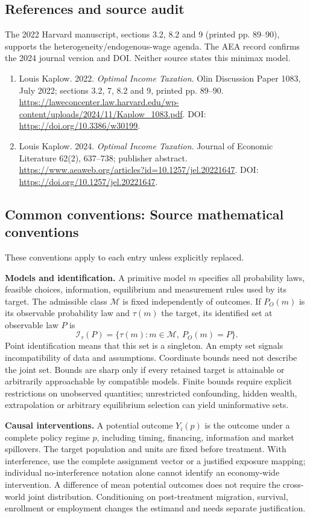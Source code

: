 \documentclass[11pt,a4paper]{article}
\begin{document}
\subsection*{References and source audit}
The 2022 Harvard manuscript, sections 3.2, 8.2 and 9 (printed pp. 89--90), supports the heterogeneity/endogenous-wage agenda. The AEA record confirms the 2024 journal version and DOI. Neither source states this minimax model.
\begin{enumerate}\raggedright
\item\hypertarget{definitions:source:30007752:1}{} Louis Kaplow. 2022. \emph{Optimal Income Taxation}. Olin Discussion Paper 1083, July 2022; sections 3.2, 7, 8.2 and 9, printed pp. 89–90.
\url{https://laweconcenter.law.harvard.edu/wp-content/uploads/2024/11/Kaplow_1083.pdf}.
DOI: \url{https://doi.org/10.3386/w30199}.
\item\hypertarget{definitions:source:30007752:2}{} Louis Kaplow. 2024. \emph{Optimal Income Taxation}. Journal of Economic Literature 62(2), 637–738; publisher abstract.
\url{https://www.aeaweb.org/articles?id=10.1257/jel.20221647}.
DOI: \url{https://doi.org/10.1257/jel.20221647}.
\end{enumerate}

\subsection*{Common conventions: Source mathematical conventions}

These conventions apply to each entry unless explicitly replaced.

\textbf{Models and identification.} A primitive model \(m\) specifies all probability laws, feasible choices, information, equilibrium and measurement rules used by its target. The admissible class \(\mathcal M\) is fixed independently of outcomes. If \(P_O(m)\) is its observable probability law and \(\tau(m)\) the target, its identified set at observable law \(P\) is
\[
 \mathcal I_\tau(P)=\{\tau(m):m\in\mathcal M,\ P_O(m)=P\}.
\]
Point identification means that this set is a singleton. An empty set signals incompatibility of data and assumptions. Coordinate bounds need not describe the joint set. Bounds are sharp only if every retained target is attainable or arbitrarily approachable by compatible models. Finite bounds require explicit restrictions on unobserved quantities; unrestricted confounding, hidden wealth, extrapolation or arbitrary equilibrium selection can yield uninformative sets.

\textbf{Causal interventions.} A potential outcome \(Y_i(p)\) is the outcome under a complete policy regime \(p\), including timing, financing, information and market spillovers. The target population and units are fixed before treatment. With interference, use the complete assignment vector or a justified exposure mapping; individual no-interference notation alone cannot identify an economy-wide intervention. A difference of mean potential outcomes does not require the cross-world joint distribution. Conditioning on post-treatment migration, survival, enrollment or employment changes the estimand and needs separate justification.
\end{document}
